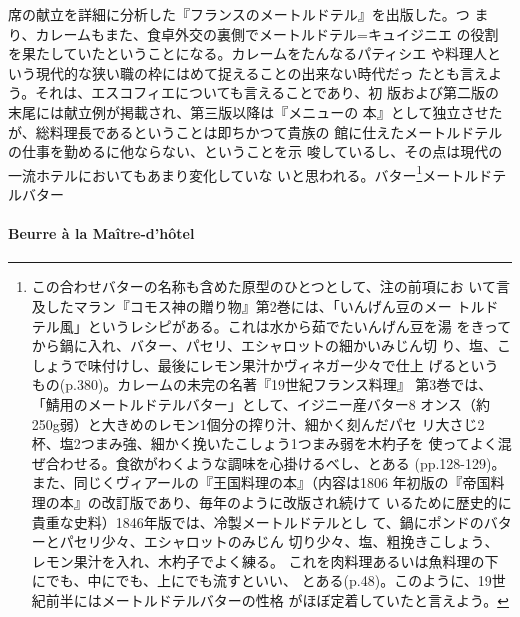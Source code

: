 \begin{recette}
{{{{  席の献立を詳細に分析した『フランスのメートルドテル』を出版した。つ
  まり、カレームもまた、食卓外交の裏側でメートルドテル=キュイジニエ
  の役割を果たしていたということになる。カレームをたんなるパティシエ
  や料理人という現代的な狭い職の枠にはめて捉えることの出来ない時代だっ
  たとも言えよう。それは、エスコフィエについても言えることであり、初
  版および第二版の末尾には献立例が掲載され、第三版以降は『メニューの
  本』として独立させたが、総料理長であるということは即ちかつて貴族の
  館に仕えたメートルドテルの仕事を勤めるに他ならない、ということを示
  唆しているし、その点は現代の一流ホテルにおいてもあまり変化していな
  いと思われる。}バター\footnote{この合わせバターの名称も含めた原型のひとつとして、注の前項にお
  いて言及したマラン『コモス神の贈り物』第2巻には、「いんげん豆のメー
  トルドテル風」というレシピがある。これは水から茹でたいんげん豆を湯
  をきってから鍋に入れ、バター、パセリ、エシャロットの細かいみじん切
  り、塩、こしょうで味付けし、最後にレモン果汁かヴィネガー少々で仕上
  げるというもの(p.380)。カレームの未完の名著『19世紀フランス料理』
  第3巻では、「鯖用のメートルドテルバター」として、イジニー産バター8
  オンス（約250g弱）と大きめのレモン1個分の搾り汁、細かく刻んだパセ
  リ大さじ2杯、塩2つまみ強、細かく挽いたこしょう1つまみ弱を木杓子を
  使ってよく混ぜ合わせる。食欲がわくような調味を心掛けるべし、とある
  (pp.128-129)。また、同じくヴィアールの『王国料理の本』（内容は1806
  年初版の『帝国料理の本』の改訂版であり、毎年のように改版され続けて
  いるために歴史的に貴重な史料）1846年版では、冷製メートルドテルとし
  て、鍋に\unquart{}ポンドのバターとパセリ少々、エシャロットのみじん
  切り少々、塩、粗挽きこしょう、レモン果汁を入れ、木杓子でよく練る。
  これを肉料理あるいは魚料理の下にでも、中にでも、上にでも流すといい、
  とある(p.48)。このように、19世紀前半にはメートルドテルバターの性格
  がほぼ定着していたと言えよう。}}{メートルドテルバター}}\label{ux30e1ux30fcux30c8ux30ebux30c9ux30c6ux30eb25ux30d0ux30bfux30fc26}}

\hypertarget{beurre-maitre-d-hotel}{%
\paragraph{Beurre à la Maître-d'hôtel}\label{beurre-maitre-d-hotel}}



\end{recette}
